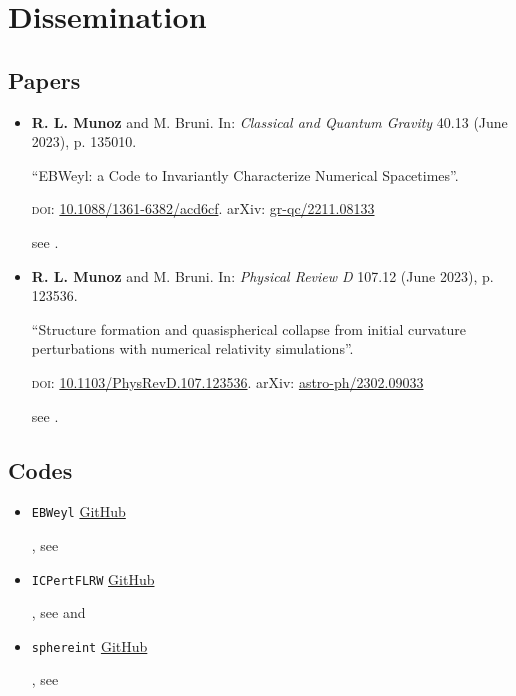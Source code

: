 \chapter{Dissemination}

\section{Papers}

\begin{itemize}[label=]
    \item \textbf{R. L. Munoz} and M. Bruni. 
    In: \textit{Classical and Quantum Gravity} 40.13 (June 2023), p. 135010.
    
    “EBWeyl: a Code to Invariantly Characterize Numerical Spacetimes”. 
    
    \textsc{doi}: \href{https://doi.org/10.1088/1361-6382/acd6cf}{10.1088/1361-6382/acd6cf}.
    arXiv: \href{https://arxiv.org/abs/2211.08133}{gr-qc/2211.08133} 
    
    \autocite{R.L.Munoz_M.Bruni_2022} see .
    
    \item \textbf{R. L. Munoz} and M. Bruni.
    In: \textit{Physical Review D} 107.12 (June 2023), p. 123536. 
    
    “Structure formation and quasispherical collapse from initial curvature perturbations with numerical relativity simulations”. 
    
    \textsc{doi}: \href{https://doi.org/10.1103/PhysRevD.107.123536}{10.1103/PhysRevD.107.123536}. 
    arXiv: \href{https://arxiv.org/abs/2302.09033}{astro-ph/2302.09033}
    
    \autocite{R.L.Munoz_M.Bruni_2023} see .
\end{itemize}

\section{Codes}

\begin{itemize}[label=]
    \item \texttt{EBWeyl} \href{https://github.com/robynlm/ebweyl}{GitHub} 
    
    \autocite{R.L.Munoz_2022_EBWeyl, R.L.Munoz_M.Bruni_2022}, see 
    
    \item \texttt{ICPertFLRW} \href{https://github.com/robynlm/ebweyl}{GitHub} 
    
    \autocite{R.L.Munoz_2023_ICPertFLRW, R.L.Munoz_M.Bruni_2023}, see  and 
    
    \item \texttt{sphereint} \href{https://github.com/robynlm/sphereint}{GitHub} 
    
    \autocite{R.L.Munoz_2022_sphereint, R.L.Munoz_M.Bruni_2023}, see 
\end{itemize}